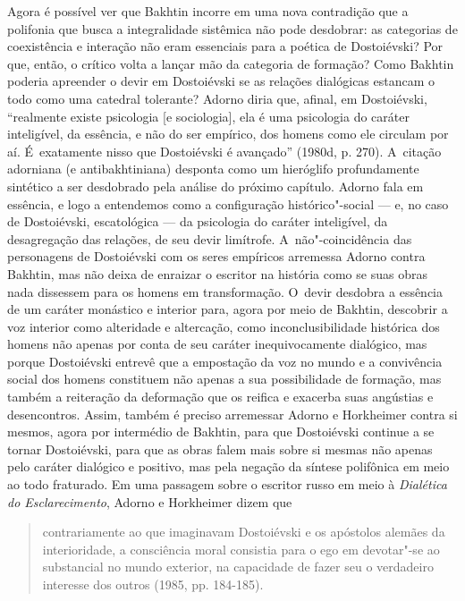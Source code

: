 Agora é possível ver que Bakhtin incorre em uma nova contradição que a
polifonia que busca a integralidade sistêmica não pode desdobrar: as
categorias de coexistência e interação não eram essenciais para a
poética de Dostoiévski? Por que, então, o crítico volta a lançar mão da
categoria de formação? Como Bakhtin poderia apreender o devir em
Dostoiévski se as relações dialógicas estancam o todo como uma catedral
tolerante? Adorno diria que, afinal, em Dostoiévski, ``realmente existe
psicologia {[}e sociologia{]}, ela é uma psicologia do caráter
inteligível, da essência, e não do ser empírico, dos homens como ele
circulam por aí. É~exatamente nisso que Dostoiévski é avançado'' (1980d,
p. 270). A~citação adorniana (e antibakhtiniana) desponta como um
hieróglifo profundamente sintético a ser desdobrado pela análise do
próximo capítulo. Adorno fala em essência, e logo a entendemos como a
configuração histórico"-social --- e, no caso de Dostoiévski, escatológica
--- da psicologia do caráter inteligível, da desagregação das relações,
de seu devir limítrofe. A~não"-coincidência das personagens de
Dostoiévski com os seres empíricos arremessa Adorno contra Bakhtin, mas
não deixa de enraizar o escritor na história como se suas obras nada
dissessem para os homens em transformação. O~devir desdobra a essência
de um caráter monástico e interior para, agora por meio de Bakhtin,
descobrir a voz interior como alteridade e altercação, como
inconclusibilidade histórica dos homens não apenas por conta de seu
caráter inequivocamente dialógico, mas porque Dostoiévski entrevê que a
empostação da voz no mundo e a convivência social dos homens constituem
não apenas a sua possibilidade de formação, mas também a reiteração da
deformação que os reifica e exacerba suas angústias e desencontros.
Assim, também é preciso arremessar Adorno e Horkheimer contra si mesmos,
agora por intermédio de Bakhtin, para que Dostoiévski continue a se
tornar Dostoiévski, para que as obras falem mais sobre si mesmas não
apenas pelo caráter dialógico e positivo, mas pela negação da síntese
polifônica em meio ao todo fraturado. Em uma passagem sobre o escritor
russo em meio à \emph{Dialética do Esclarecimento}, Adorno e Horkheimer
dizem que

\begin{quote}
contrariamente ao que imaginavam Dostoiévski e os apóstolos alemães da
interioridade, a consciência moral consistia para o ego em devotar"-se ao
substancial no mundo exterior, na capacidade de fazer seu o verdadeiro
interesse dos outros (1985, pp. 184-185).
\end{quote}

